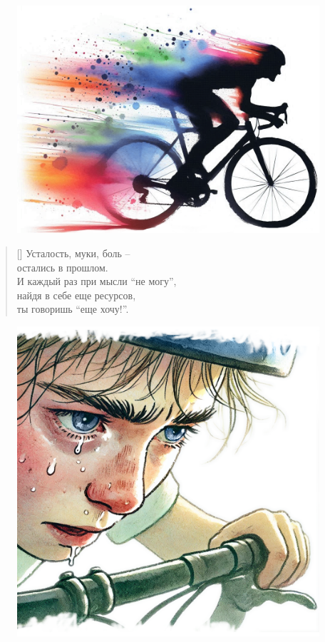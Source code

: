 \documentclass[a5paper,11pt]{memoir}
\begin{document}
\begin{figure}
	\includegraphics[width=\textwidth]{images/accelerate.png}
  \end{figure}

\clearpage

\begin{verse}[\versewidth]
Усталость, муки, боль -- \\
остались в прошлом.\\
И каждый раз при мысли ``не могу'',\\
найдя в себе еще ресурсов,\\
ты говоришь ``еще хочу!''.
\end{verse}

\begin{figure}[h]
	\vspace{-10pt}
	\hspace{-32pt}
	\includegraphics[width=\textwidth]{images/cyclist-resilience.png}
  \end{figure}
\end{document}
